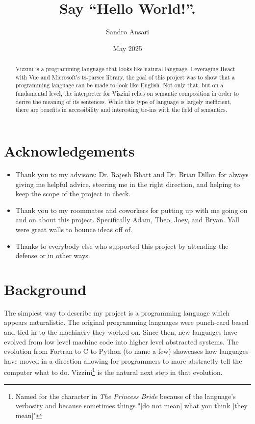 \documentclass[titlepage]{article}
\title{Say ``Hello World!''.}
\author{Sandro Ansari}
\date{May 2025}
\newcommand{\langName}{Vizzini}
\begin{document}
\maketitle

\begin{abstract}
	\langName{} is a programming language that looks like natural language. Leveraging React with Vue and Microsoft's ts-parsec library, the goal of this project was to show that a programming language can be made to look like English. Not only that, but on a fundamental level, the interpreter for \langName{} relies on semantic composition in order to derive the meaning of its sentences. While this type of language is largely inefficient, there are benefits in accessibility and interesting tie-ins with the field of semantics.
\end{abstract}

\section*{Acknowledgements}
\begin{itemize}
	\item Thank you to my advisors: Dr. Rajesh Bhatt and Dr. Brian Dillon for always giving me helpful advice, steering me in the right direction, and helping to keep the scope of the project in check.
	\item Thank you to my roommates and coworkers for putting up with me going on and on about this project. Specifically Adam, Theo, Joey, and Bryan. Yall were great walls to bounce ideas off of.
	\item Thanks to everybody else who supported this project by attending the defense or in other ways.
\end{itemize}

\newpage{}
\section*{Background}
The simplest way to describe my project is a programming language which appears naturalistic. The original programming languages were punch-card based and tied in to the machinery they worked on. Since then, new languages have evolved from low level machine code into higher level abstracted systems. The evolution from Fortran to C to Python (to name a few) showcases how languages have moved in a direction allowing for programmers to more abstractly tell the computer what to do. \langName{}\footnote{Named for the character in \textit{The Princess Bride} because of the language's verbosity and because sometimes things "[do not mean] what you think [they mean]"\cite{Goldman_1987}} is the natural next step in that evolution.
\end{document}
